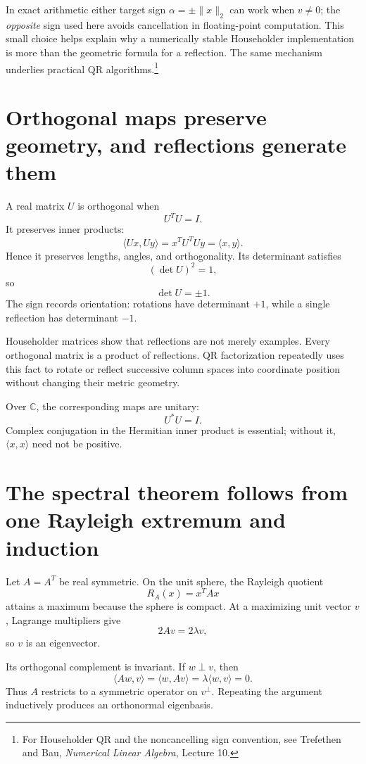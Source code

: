 In exact arithmetic either target sign \(\alpha=\pm\|x\|_2\) can work when \(v\ne0\); the \emph{opposite} sign used here avoids cancellation in floating-point computation. This small choice helps explain why a numerically stable Householder implementation is more than the geometric formula for a reflection. The same mechanism underlies practical QR algorithms.\footnote{For Householder QR and the noncancelling sign convention, see Trefethen and Bau, \emph{Numerical Linear Algebra}, Lecture 10.}

\section{Orthogonal maps preserve geometry, and reflections generate them}

A real matrix \(U\) is orthogonal when
\[
  U^TU=I.
\]
It preserves inner products:
\[
  \langle Ux,Uy\rangle
  =x^TU^TUy
  =\langle x,y\rangle.
\]
Hence it preserves lengths, angles, and orthogonality.  Its determinant satisfies
\[
  (\det U)^2=1,
\]
so
\[
  \det U=\pm1.
\]
The sign records orientation: rotations have determinant \(+1\), while a single reflection has determinant \(-1\).

Householder matrices show that reflections are not merely examples.  Every orthogonal matrix is a product of reflections.  QR factorization repeatedly uses this fact to rotate or reflect successive column spaces into coordinate position without changing their metric geometry.

Over \(\mathbb C\), the corresponding maps are unitary:
\[
  U^*U=I.
\]
Complex conjugation in the Hermitian inner product is essential; without it, \(\langle x,x\rangle\) need not be positive.

\section{The spectral theorem follows from one Rayleigh extremum and induction}

Let \(A=A^T\) be real symmetric.  On the unit sphere, the Rayleigh quotient
\[
  R_A(x)=x^TAx
\]
attains a maximum because the sphere is compact.  At a maximizing unit vector \(v\), Lagrange multipliers give
\[
  2Av=2\lambda v,
\]
so \(v\) is an eigenvector.

Its orthogonal complement is invariant.  If \(w\perp v\), then
\[
  \langle Aw,v\rangle
  =\langle w,Av\rangle
  =\lambda\langle w,v\rangle=0.
\]
Thus \(A\) restricts to a symmetric operator on \(v^\perp\).  Repeating the argument inductively produces an orthonormal eigenbasis.


